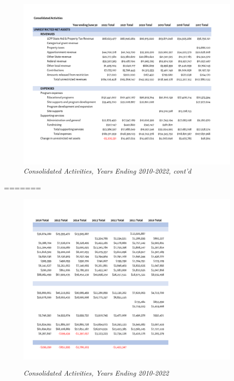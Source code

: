 \begin{figure}
  \caption*{\textit{Consolidated Activities, Years Ending 2010-2022, cont'd}} %
  \includegraphics[page=4,width=0.9\textheight]{Consolidated_Activities_Years_2010-2022} %
\end{figure}
=======
\begin{figure}[hbt]
    \caption[Consolidated Activities, Years Ending 2010–2022]{\textit{Consolidated Activities, Years Ending 2010-2022}}\label{fig:consolidated_activities_2010-2022-3} %
    \includegraphics[width=\textwidth]{Consolidated_Financial_Statements/v5_Spreadsheets/Consolidated_Activities_Years_2010-2022_PDF_pages/.pg_0003}\\ %
\end{figure}
